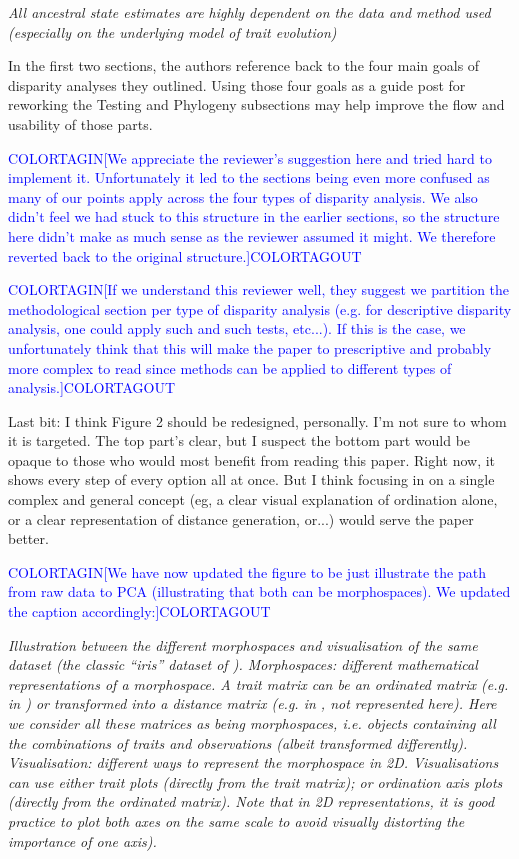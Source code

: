 \documentclass[12pt,letterpaper]{article}
\begin{document}
\textit{All ancestral state estimates are highly dependent on the data and method used (especially on the underlying model of trait evolution)}

\noindent In the first two sections, the authors reference back to the four main goals of disparity analyses they outlined. Using those four goals as a guide post for reworking the Testing and Phylogeny subsections may help improve the flow and usability of those parts.

\textcolor{blue}{COLORTAGIN[We appreciate the reviewer's suggestion here and tried hard to implement it. Unfortunately it led to the sections being even more confused as many of our points apply across the four types of disparity analysis. We also didn't feel we had stuck to this structure in the earlier sections, so the structure here didn't make as much sense as the reviewer assumed it might. We therefore reverted back to the original structure.]COLORTAGOUT}

\textcolor{blue}{COLORTAGIN[If we understand this reviewer well, they suggest we partition the methodological section per type of disparity analysis (e.g. for descriptive disparity analysis, one could apply such and such tests, etc...). If this is the case, we unfortunately think that this will make the paper to prescriptive and probably more complex to read since methods can be applied to different types of analysis.]COLORTAGOUT}

\noindent Last bit: I think Figure 2 should be redesigned, personally. I'm not sure to whom it is targeted. The top part's clear, but I suspect the bottom part would be opaque to those who would most benefit from reading this paper. Right now, it shows every step of every option all at once. But I think focusing in on a single complex and general concept (eg, a clear visual explanation of ordination alone, or a clear representation of distance generation, or...) would serve the paper better. 

\textcolor{blue}{COLORTAGIN[We have now updated the figure to be just illustrate the path from raw data to PCA (illustrating that both can be morphospaces). We updated the caption accordingly:]COLORTAGOUT}

\textit{Illustration between the different morphospaces and visualisation of the same dataset (the classic ``iris'' dataset of \citealt{edgar1935irises,fisher1936use}).
Morphospaces: different mathematical representations of a morphospace. A trait matrix can be an ordinated matrix (e.g. in \citealt{tyler2011detecting}) or transformed into a distance matrix (e.g. in \citealt{Close2015}, not represented here).
Here we consider all these matrices as being \textit{morphospaces}, i.e. objects containing all the combinations of traits and observations (albeit transformed differently).
Visualisation: different  ways to represent the morphospace in 2D.
Visualisations can use either trait plots (directly from the trait matrix); or ordination axis plots (directly from the ordinated matrix).
Note that in 2D representations, it is good practice to plot both axes on the same scale to avoid visually distorting the importance of one axis).}
\end{document}
